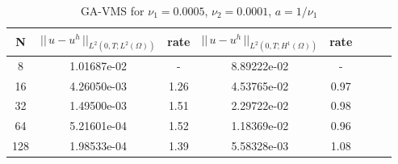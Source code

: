 \documentclass[10pt]{article}%
\numberwithin{equation}{section}
\begin{document}
\begin{table}[!ht]
	\caption{GA-VMS for $\nu_1 = 0.0005$, $\nu_2 = 0.0001$, $a = 1/\nu_1$}
	\begin{center} \label{table:GA-VMSsmall}
		\begin{tabular}{|c|c|c|c|c|c|c|c|}
			\hline N  & $||\,u-u^h\,||_{L^2(0,T;L^2(\Omega))}$ & rate & $||\,u-u^h\,||_{L^2(0,T;H^1(\Omega))}$ & rate\\
			\hline 8  & 1.01687e-02 & -    & 8.89222e-02 & -    \\
			\hline 16 & 4.26050e-03 & 1.26 & 4.53765e-02 & 0.97 \\
			\hline 32 & 1.49500e-03 & 1.51 & 2.29722e-02 & 0.98 \\
			\hline 64 & 5.21601e-04 & 1.52 & 1.18369e-02 & 0.96 \\
			\hline 128& 1.98533e-04 & 1.39 & 5.58328e-03 & 1.08 \\
			\hline
		\end{tabular}
	\end{center}
\end{table}
\end{document}
